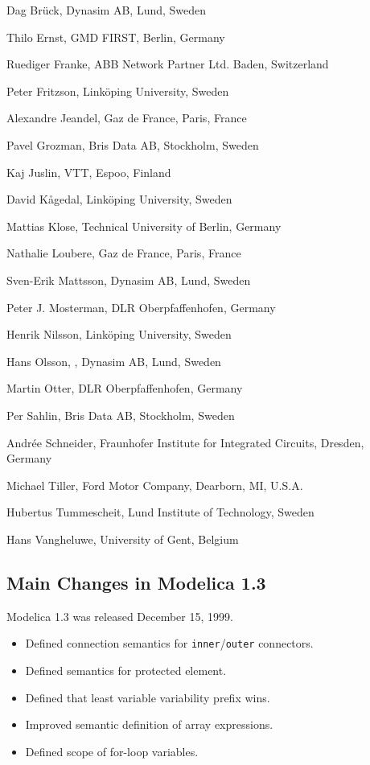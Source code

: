 Dag Brück, Dynasim AB, Lund, Sweden

Thilo Ernst, GMD FIRST, Berlin, Germany

Ruediger Franke, ABB Network Partner Ltd. Baden, Switzerland

Peter Fritzson, Linköping University, Sweden

Alexandre Jeandel, Gaz de France, Paris, France

Pavel Grozman, Bris Data AB, Stockholm, Sweden

Kaj Juslin, VTT, Espoo, Finland

David Kågedal, Linköping University, Sweden

Mattias Klose, Technical University of Berlin, Germany

Nathalie Loubere, Gaz de France, Paris, France

Sven-Erik Mattsson, Dynasim AB, Lund, Sweden

Peter J. Mosterman, DLR Oberpfaffenhofen, Germany

Henrik Nilsson, Linköping University, Sweden

Hans Olsson, , Dynasim AB, Lund, Sweden

Martin Otter, DLR Oberpfaffenhofen, Germany

Per Sahlin, Bris Data AB, Stockholm, Sweden

Andrée Schneider, Fraunhofer Institute for Integrated Circuits, Dresden,
Germany

Michael Tiller, Ford Motor Company, Dearborn, MI, U.S.A.

Hubertus Tummescheit, Lund Institute of Technology, Sweden

Hans Vangheluwe, University of Gent, Belgium

\subsection{Main Changes in Modelica 1.3}

Modelica 1.3 was released December 15, 1999.

\begin{itemize}
\item
  Defined connection semantics for \lstinline!inner!/\lstinline!outer! connectors.
\item
  Defined semantics for protected element.
\item
  Defined that least variable variability prefix wins.
\item
  Improved semantic definition of array expressions.
\item
  Defined scope of for-loop variables.
\end{itemize}

